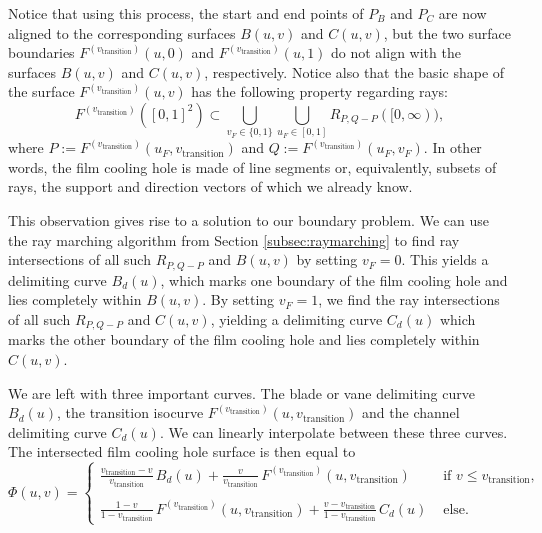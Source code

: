 \documentclass[a4paper, 11pt]{report}
\theoremstyle{definition}
\begin{document}
	Notice that using this process, the start and end points of $P_B$ and $P_C$ are now aligned to the corresponding surfaces $B(u,v)$ and $C(u,v)$, but the two surface boundaries $F^{(v_\textrm{transition})}(u,0)$ and $F^{(v_\textrm{transition})}(u,1)$ do not align with the surfaces $B(u,v)$ and $C(u,v)$, respectively. Notice also that the basic shape of the surface $F^{(v_\textrm{transition})}(u,v)$ has the following property regarding rays:
		$$ F^{(v_\textrm{transition})}([0,1]^2) \subset \bigcup_{v_F \in \{0,1\}}\bigcup_{u_F\in[0,1]} R_{P,Q-P}([0, \infty)), $$
	where $P := F^{(v_\textrm{transition})}(u_F,v_\textrm{transition})$ and $Q := F^{(v_\textrm{transition})}(u_F,v_F)$.
	In other words, the film cooling hole is made of line segments or, equivalently, subsets of rays, the support and direction vectors of which we already know.

	This observation gives rise to a solution to our boundary problem. We can use the ray marching algorithm from Section \ref{subsec:raymarching} to find ray intersections of all such $R_{P,Q-P}$ and $B(u,v)$ by setting $v_F = 0$. This yields a delimiting curve $B_d(u)$, which marks one boundary of the film cooling hole and lies completely within $B(u,v)$. By setting $v_F = 1$, we find the ray intersections of all such $R_{P, Q-P}$ and $C(u,v)$, yielding a delimiting curve $C_d(u)$ which marks the other boundary of the film cooling hole and lies completely within $C(u,v)$.

	We are left with three important curves. The blade or vane delimiting curve $B_d(u)$, the transition isocurve $F^{(v_\textrm{transition})}(u,v_\textrm{transition})$ and the channel delimiting curve $C_d(u)$. We can linearly interpolate between these three curves. The intersected film cooling hole surface is then equal to
		$$ \Phi(u,v) = 
				\begin{cases}
					\frac{v_\textrm{transition} - v}{v_\textrm{transition}} \, B_d(u) +
					\frac{v}{v_\textrm{transition}} \, F^{(v_\textrm{transition})}(u,v_\textrm{transition})
					& \textrm{ if } v \leq v_\textrm{transition}, \\

					\\[-0.5em]
					
					\frac{1 - v}{1 - v_\textrm{transition}} \, F^{(v_\textrm{transition})}(u,v_\textrm{transition}) + 
					\frac{v - v_\textrm{transition}}{1 - v_\textrm{transition}} \, C_d(u)		
					& \textrm{ else.}

				\end{cases}
		 $$
\end{document}
